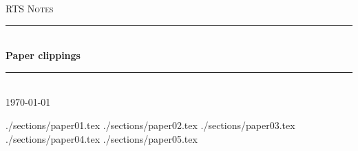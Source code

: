 \documentclass[12pt]{article} %
\begin{document}

\begin{titlepage}

\newcommand{\HRule}{\rule{\linewidth}{0.5mm}} %

\center %

\textsc{\Large RTS Notes}\\[0.5cm] %

\HRule \\[0.4cm]
{ \huge \bfseries Paper clippings}\\[0.4cm] %
\HRule \\[1.5cm]

{\large \today}\\[3cm] %


\vfill %

\end{titlepage}


\tableofcontents %

\newpage %

 {./sections/paper01.tex}
 {./sections/paper02.tex}
 {./sections/paper03.tex}
 {./sections/paper04.tex}
 {./sections/paper05.tex}
\end{document}
